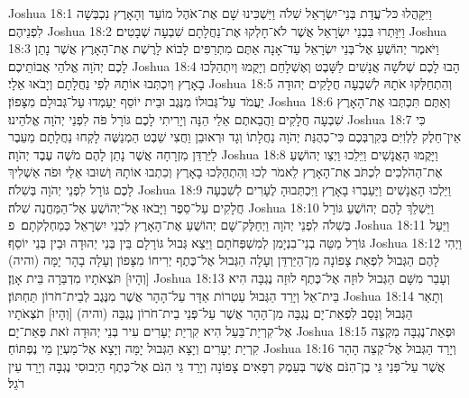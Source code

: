 Joshua 18:1	וַיִּקָּהֲלוּ כּל־עֲדַת בְּנֵי־יִשְׂרָאֵל שִׁלֹה וַיַּשְׁכִּינוּ שָׁם אֶת־אֹהֶל מוֹעֵד וְהָאָרֶץ נִכְבְּשָׁה לִפְנֵיהֶם׃
Joshua 18:2	וַיִּוָּתְרוּ בִּבְנֵי יִשְׂרָאֵל אֲשֶׁר לֹא־חָלְקוּ אֶת־נַחֲלָתָם שִׁבְעָה שְׁבָטִים׃
Joshua 18:3	וַיֹּאמֶר יְהוֹשֻׁעַ אֶל־בְּנֵי יִשְׂרָאֵל עַד־אָנָה אַתֶּם מִתְרַפִּים לָבוֹא לָרֶשֶׁת אֶת־הָאָרֶץ אֲשֶׁר נָתַן לָכֶם יְהֹוָה אֱלֹהֵי אֲבוֹתֵיכֶם׃
Joshua 18:4	הָבוּ לָכֶם שְׁלֹשָׁה אֲנָשִׁים לַשָּׁבֶט וְאֶשְׁלָחֵם וְיָקֻמוּ וְיִתְהַלְּכוּ בָאָרֶץ וְיִכְתְּבוּ אוֹתָהּ לְפִי נַחֲלָתָם וְיָבֹאוּ אֵלָי׃
Joshua 18:5	וְהִתְחַלְּקוּ אֹתָהּ לְשִׁבְעָה חֲלָקִים יְהוּדָה יַעֲמֹד עַל־גְּבוּלוֹ מִנֶּגֶב וּבֵית יוֹסֵף יַעַמְדוּ עַל־גְּבוּלָם מִצָּפוֹן׃
Joshua 18:6	וְאַתֶּם תִּכְתְּבוּ אֶת־הָאָרֶץ שִׁבְעָה חֲלָקִים וַהֲבֵאתֶם אֵלַי הֵנָּה וְיָרִיתִי לָכֶם גּוֹרָל פֹּה לִפְנֵי יְהֹוָה אֱלֹהֵינוּ׃
Joshua 18:7	כִּי אֵין־חֵלֶק לַלְוִיִּם בְּקִרְבְּכֶם כִּי־כְהֻנַּת יְהֹוָה נַחֲלָתוֹ וְגָד וּרְאוּבֵן וַחֲצִי שֵׁבֶט הַמְנַשֶּׁה לָקְחוּ נַחֲלָתָם מֵעֵבֶר לַיַּרְדֵּן מִזְרָחָה אֲשֶׁר נָתַן לָהֶם מֹשֶׁה עֶבֶד יְהֹוָה׃
Joshua 18:8	וַיָּקֻמוּ הָאֲנָשִׁים וַיֵּלֵכוּ וַיְצַו יְהוֹשֻׁעַ אֶת־הַהֹלְכִים לִכְתֹּב אֶת־הָאָרֶץ לֵאמֹר לְכוּ וְהִתְהַלְּכוּ בָאָרֶץ וְכִתְבוּ אוֹתָהּ וְשׁוּבוּ אֵלַי וּפֹה אַשְׁלִיךְ לָכֶם גּוֹרָל לִפְנֵי יְהֹוָה בְּשִׁלֹה׃
Joshua 18:9	וַיֵּלְכוּ הָאֲנָשִׁים וַיַּעַבְרוּ בָאָרֶץ וַיִּכְתְּבוּהָ לֶעָרִים לְשִׁבְעָה חֲלָקִים עַל־סֵפֶר וַיָּבֹאוּ אֶל־יְהוֹשֻׁעַ אֶל־הַמַּחֲנֶה שִׁלֹה׃
Joshua 18:10	וַיַּשְׁלֵךְ לָהֶם יְהוֹשֻׁעַ גּוֹרָל בְּשִׁלֹה לִפְנֵי יְהֹוָה וַיְחַלֶּק־שָׁם יְהוֹשֻׁעַ אֶת־הָאָרֶץ לִבְנֵי יִשְׂרָאֵל כְּמַחְלְקֹתָם׃ {פ}
Joshua 18:11	וַיַּעַל גּוֹרַל מַטֵּה בְנֵי־בִנְיָמִן לְמִשְׁפְּחֹתָם וַיֵּצֵא גְּבוּל גּוֹרָלָם בֵּין בְּנֵי יְהוּדָה וּבֵין בְּנֵי יוֹסֵף׃
Joshua 18:12	וַיְהִי לָהֶם הַגְּבוּל לִפְאַת צָפוֹנָה מִן־הַיַּרְדֵּן וְעָלָה הַגְּבוּל אֶל־כֶּתֶף יְרִיחוֹ מִצָּפוֹן וְעָלָה בָהָר יָמָּה (והיה) [וְהָיוּ] תֹּצְאֹתָיו מִדְבַּרָה בֵּית אָוֶן׃
Joshua 18:13	וְעָבַר מִשָּׁם הַגְּבוּל לוּזָה אֶל־כֶּתֶף לוּזָה נֶגְבָּה הִיא בֵּית־אֵל וְיָרַד הַגְּבוּל עַטְרוֹת אַדָּר עַל־הָהָר אֲשֶׁר מִנֶּגֶב לְבֵית־חֹרוֹן תַּחְתּוֹן׃
Joshua 18:14	וְתָאַר הַגְּבוּל וְנָסַב לִפְאַת־יָם נֶגְבָּה מִן־הָהָר אֲשֶׁר עַל־פְּנֵי בֵית־חֹרוֹן נֶגְבָּה (והיה) [וְהָיוּ] תֹצְאֹתָיו אֶל־קִרְיַת־בַּעַל הִיא קִרְיַת יְעָרִים עִיר בְּנֵי יְהוּדָה זֹאת פְּאַת־יָם׃
Joshua 18:15	וּפְאַת־נֶגְבָּה מִקְצֵה קִרְיַת יְעָרִים וְיָצָא הַגְּבוּל יָמָּה וְיָצָא אֶל־מַעְיַן מֵי נֶפְתּוֹחַ׃
Joshua 18:16	וְיָרַד הַגְּבוּל אֶל־קְצֵה הָהָר אֲשֶׁר עַל־פְּנֵי גֵּי בֶן־הִנֹּם אֲשֶׁר בְּעֵמֶק רְפָאִים צָפוֹנָה וְיָרַד גֵּי הִנֹּם אֶל־כֶּתֶף הַיְבוּסִי נֶגְבָּה וְיָרַד עֵין רֹגֵל׃
